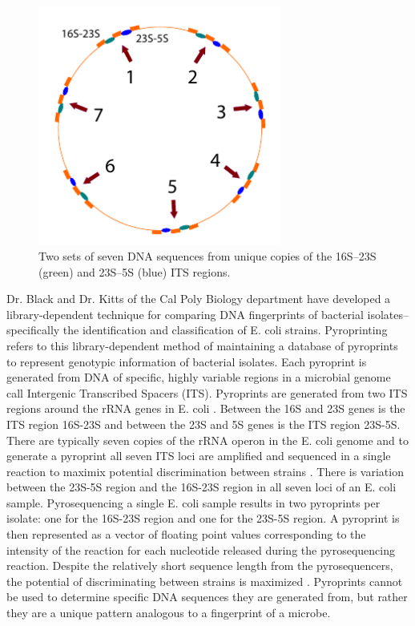 \begin{figure}
\begin{center}
\includegraphics[width=80mm]{images/dna.pdf}
\caption[Pyroprinted regions of E. coli DNA]{Two sets of seven DNA sequences from unique copies of the 16S–23S (green) and 23S–5S (blue) ITS regions.}
\label{fig:dna}
\end{center}
\end{figure}

Dr. Black and Dr. Kitts of the Cal Poly Biology department have developed a library-dependent technique for comparing DNA fingerprints of bacterial isolates--specifically the identification and classification of E. coli strains. Pyroprinting refers to this library-dependent method of maintaining a database of pyroprints to represent genotypic information of bacterial isolates. Each pyroprint is generated from DNA of specific, highly variable regions in a microbial genome \cite{JanSoliman} call Intergenic Transcribed Spacers (ITS). Pyroprints are generated from two ITS regions around the rRNA genes in E. coli \cite{JanSoliman}. Between the 16S and 23S genes is the ITS region 16S-23S and between the 23S and 5S genes is the ITS region 23S-5S. There are typically seven copies of the rRNA operon in the E. coli genome and to generate a pyroprint all seven ITS loci are amplified and sequenced in a single reaction to maximix potential discrimination between strains \cite{JanSoliman}. There is variation between the 23S-5S region and the 16S-23S region in all seven loci of an E. coli sample. Pyrosequencing a single E. coli sample results in two pyroprints per isolate: one for the 16S-23S region and one for the 23S-5S region. A pyroprint is then represented as a vector of floating point values corresponding to the intensity of the reaction for each nucleotide released during the pyrosequencing reaction. Despite the relatively short sequence length from the pyrosequencers, the potential of discriminating between strains is maximized \cite{JanSoliman}. Pyroprints cannot be used to determine specific DNA sequences they are generated from, but rather they are a unique pattern analogous to a fingerprint of a microbe.

